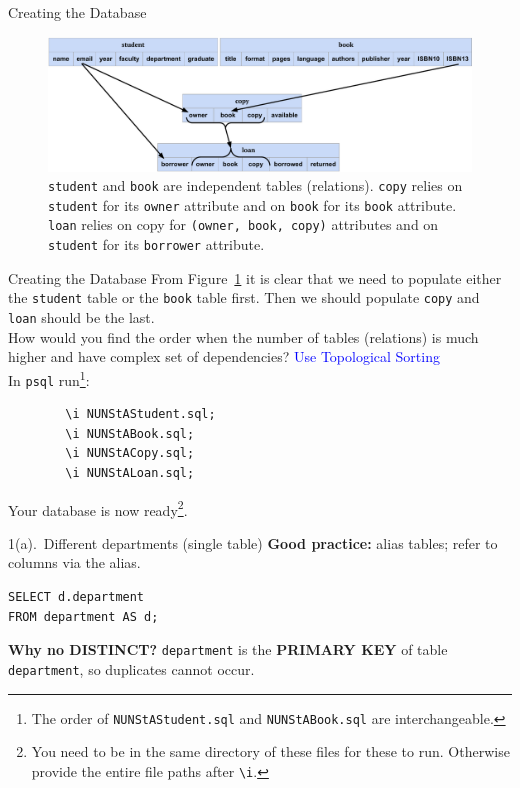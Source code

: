 \documentclass{beamer}
\begin{document}
\begin{frame}[fragile]{Creating the Database}
    \begin{figure}
        \centering
        \includegraphics[width=1\linewidth]{schema_t6.pdf}
        \caption{\texttt{student} and \texttt{book} are independent tables (relations). \texttt{copy} relies on \texttt{student} for its \texttt{owner} attribute and on \texttt{book} for its \texttt{book} attribute. \texttt{loan} relies on copy for \texttt{(owner, book, copy)} attributes and on \texttt{student} for its \texttt{borrower} attribute.}
        \label{fig:depend}
    \end{figure}
\end{frame}

\begin{frame}[fragile]{Creating the Database}
    From Figure~\ref{fig:depend} it is clear that we need to populate either the \texttt{student} table or the \texttt{book} table first. Then we should populate \texttt{copy} and \texttt{loan} should be the last. \\
    \pause
    \scriptsize
    \alert{How would you find the order when the number of tables (relations) is much higher and have complex set of dependencies?} \pause \textcolor{blue}{Use Topological Sorting}\\
    \pause
    \normalsize
    In \texttt{psql} run\footnote{The order of \texttt{NUNStAStudent.sql} and \texttt{NUNStABook.sql} are interchangeable.}:
    \begin{lstlisting}
        \i NUNStAStudent.sql;
        \i NUNStABook.sql;
        \i NUNStACopy.sql;
        \i NUNStALoan.sql;
    \end{lstlisting}
Your database is now ready\footnote{You need to be in the same directory of these files for these to run. Otherwise provide the entire file paths after \texttt{\textbackslash i}.}.\\
\end{frame}

\begin{frame}[fragile]{1(a).\ Different departments (single table)}
\small
\textbf{Good practice:} alias tables; refer to columns via the alias.
\begin{lstlisting}
SELECT d.department
FROM department AS d;
\end{lstlisting}
\textbf{Why no DISTINCT?} \texttt{department} is the \textbf{PRIMARY KEY} of table \texttt{department}, so duplicates cannot occur.
\end{frame}
\end{document}
